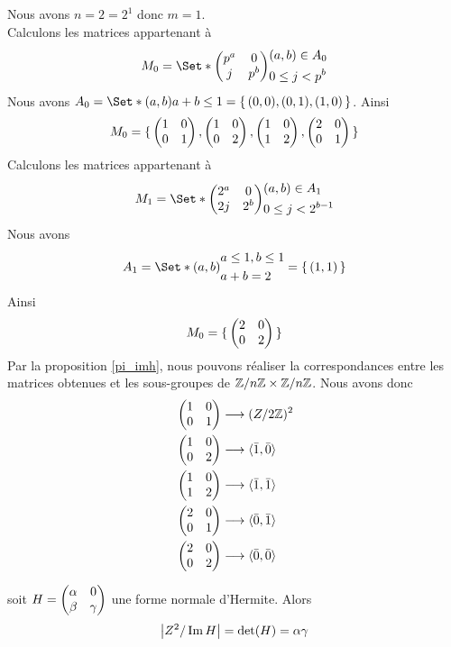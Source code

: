 \documentclass[12pt]{article}
\begin{document}
\begin{example}[Cas pour $n = 2$]
	Nous avons $n = 2 = 2^1$ donc $m = 1$.\\
	Calculons les matrices appartenant à $$M_0 = \Set*{
			\begin{pmatrix}
				p^a & 0   \\
				j   & p^b
			\end{pmatrix}
		}{
			\begin{aligned}
				 & (a, b) \in A_0  \\
				 & 0 \le j < p^{b}
			\end{aligned}
		}$$
	Nous avons $A_0 = \Set*{(a,b)}{a + b \le 1} = \set{(0,0), (0,1), (1, 0)}$.
	Ainsi
	\begin{equation*}
		M_0 = \{\,
			\begin{pmatrix} 1 & 0\\ 0 & 1 \end{pmatrix}, \begin{pmatrix} 1 & 0\\ 0 & 2 \end{pmatrix}, \begin{pmatrix} 1 & 0\\ 1 & 2 \end{pmatrix}, \begin{pmatrix} 2 & 0\\ 0 & 1 \end{pmatrix}
		 \,\}
	\end{equation*}
	Calculons les matrices appartenant à $$M_1 = \Set*{
			\matsqr{2^a}{0}{2j}{2^b}
		}{
			\begin{aligned}
				 & (a, b) \in A_1      \\
				 & 0 \le j < 2^{b - 1}
			\end{aligned}
		}$$
	Nous avons $$A_1 = \Set*{
			(a,b)}{
			\begin{aligned}
				 & a \le 1, b \le 1 \\
				 & a + b = 2
			\end{aligned}
		} = \set{(1,1)}$$
	Ainsi
	$$M_0 = \{\,\begin{pmatrix} 2 & 0\\ 0 & 2 \end{pmatrix} \,\}$$
	Par la proposition \ref{pi_imh}, nous pouvons réaliser la correspondances entre
	les matrices obtenues et les sous-groupes de $\mathbb Z/n\mathbb Z \times \mathbb Z/n\mathbb Z$. Nous avons donc
	\begin{equation*}
		\begin{aligned}
			 & \begin{pmatrix} 1 & 0\\ 0 & 1 \end{pmatrix}\longrightarrow (Z/2\mathbb Z)^2              \\
			 & \begin{pmatrix} 1 & 0\\ 0 & 2 \end{pmatrix}\longrightarrow \langle  \bar 1, \bar 0 \rangle  \\
			 & \begin{pmatrix} 1 & 0\\ 1 & 2 \end{pmatrix}\longrightarrow \langle  \bar 1,  \bar 1 \rangle \\
			 & \begin{pmatrix} 2 & 0\\ 0 & 1 \end{pmatrix} \longrightarrow \langle  \bar 0, \bar 1 \rangle \\
			 & \begin{pmatrix} 2 & 0\\ 0 & 2 \end{pmatrix} \longrightarrow \langle  \bar 0, \bar 0 \rangle
		\end{aligned}
	\end{equation*}
\end{example}

\begin{proposition}\label{card_h}
	soit $H = \begin{pmatrix} \alpha & 0\\ \beta & \gamma \end{pmatrix}$ une forme normale d'Hermite. Alors
	$$\left\lvert Z^2/\operatorname{Im} H \right\rvert = \det(H) = \alpha\gamma$$
\end{proposition}
\end{document}
